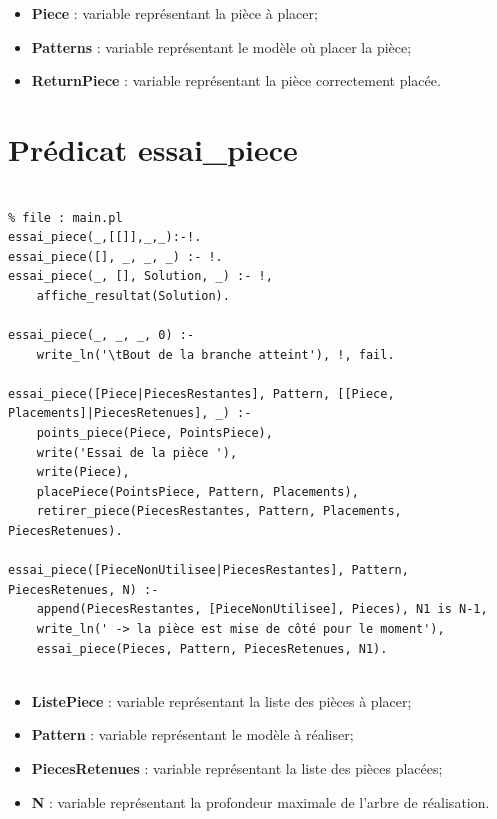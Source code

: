 \documentclass[a4paper, 11pt]{report}
\begin{document}
\begin{appendices}
\begin{verbatim}
    \end{verbatim}

    \begin{itemize}
        \item \textbf{Piece} : variable représentant la pièce à placer;
        \item \textbf{Patterns} : variable représentant le modèle où placer la pièce;
        \item \textbf{ReturnPiece} : variable représentant la pièce correctement placée.
    \end{itemize}


	\chapter{Prédicat essai\_piece}
	
    \begin{verbatim}

% file : main.pl
essai_piece(_,[[]],_,_):-!.
essai_piece([], _, _, _) :- !.
essai_piece(_, [], Solution, _) :- !, 
    affiche_resultat(Solution).

essai_piece(_, _, _, 0) :- 
    write_ln('\tBout de la branche atteint'), !, fail.

essai_piece([Piece|PiecesRestantes], Pattern, [[Piece, Placements]|PiecesRetenues], _) :-
    points_piece(Piece, PointsPiece),
    write('Essai de la pièce '),
    write(Piece),
    placePiece(PointsPiece, Pattern, Placements),
    retirer_piece(PiecesRestantes, Pattern, Placements, PiecesRetenues).

essai_piece([PieceNonUtilisee|PiecesRestantes], Pattern, PiecesRetenues, N) :- 
    append(PiecesRestantes, [PieceNonUtilisee], Pieces), N1 is N-1,
    write_ln(' -> la pièce est mise de côté pour le moment'),
    essai_piece(Pieces, Pattern, PiecesRetenues, N1).  
    
    \end{verbatim}

    \begin{itemize}
        \item \textbf{ListePiece} : variable représentant la liste des pièces à placer;
        \item \textbf{Pattern} : variable représentant le modèle à réaliser;
        \item \textbf{PiecesRetenues} : variable représentant la liste des pièces placées;
        \item \textbf{N} : variable représentant la profondeur maximale de l'arbre de réalisation.
    \end{itemize}


\end{appendices} 




		
\end{document}
